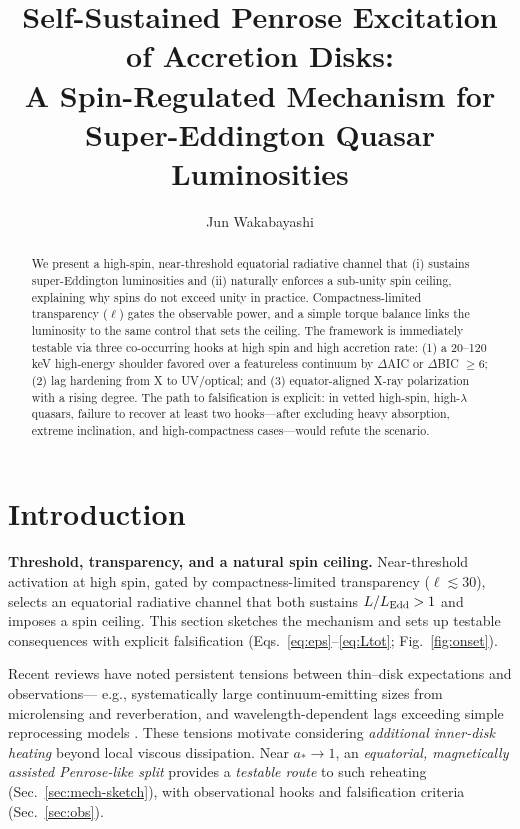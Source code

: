 \documentclass[twocolumn]{aastex701}
\begin{document}
\title{Self-Sustained Penrose Excitation of Accretion Disks:\\
A Spin-Regulated Mechanism for Super-Eddington Quasar Luminosities}

\author[0009-0008-1891-4579]{Jun Wakabayashi}

\begin{abstract}
We present a high-spin, near-threshold equatorial radiative channel that (i) sustains super-Eddington luminosities and (ii) naturally enforces a sub-unity spin ceiling, explaining why spins do not exceed unity in practice. Compactness-limited transparency ($\ell$) gates the observable power, and a simple torque balance links the luminosity to the same control that sets the ceiling. The framework is immediately testable via three co-occurring hooks at high spin and high accretion rate: (1) a 20--120 keV high-energy shoulder favored over a featureless continuum by $\Delta$AIC or $\Delta$BIC $\ge 6$; (2) lag hardening from X to UV/optical; and (3) equator-aligned X-ray polarization with a rising degree. The path to falsification is explicit: in vetted high-spin, high-$\lambda$ quasars, failure to recover at least two hooks---after excluding heavy absorption, extreme inclination, and high-compactness cases---would refute the scenario.
\end{abstract}



\section{Introduction}\label{sec:intro}
\noindent\textbf{Threshold, transparency, and a natural spin ceiling.}
Near-threshold activation at high spin, gated by compactness-limited transparency ($\ell\!\lesssim\!30$), selects an equatorial radiative channel that both sustains $L/L_{\rm Edd}>1$ and imposes a spin ceiling.
This section sketches the mechanism and sets up testable consequences with explicit falsification (Eqs.~\eqref{eq:eps}--\eqref{eq:Ltot}; Fig.~\ref{fig:onset}).

Recent reviews have noted persistent tensions between thin–disk expectations and observations—
e.g., systematically large continuum-emitting sizes from microlensing and reverberation, and
wavelength-dependent lags exceeding simple reprocessing models \citep[e.g.,][]{Cackett2021RevMap,Sun2020AGNsize}.
These tensions motivate considering \emph{additional inner-disk heating} beyond local viscous dissipation.
Near $a_*\!\to\!1$, an \emph{equatorial, magnetically assisted Penrose-like split} provides a \emph{testable route}
to such reheating (Sec.~\ref{sec:mech-sketch}), with observational hooks and falsification criteria
(Sec.~\ref{sec:obs}).
\end{document}

